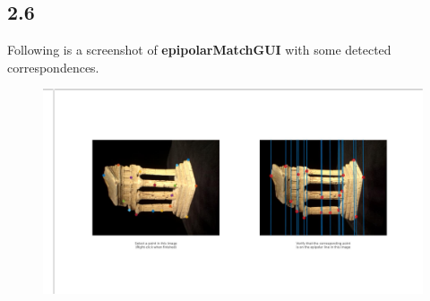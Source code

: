 \documentclass{article}
\begin{document}
\subsection*{2.6}
Following is a screenshot of \textbf{epipolarMatchGUI} with some detected correspondences.
\begin{figure}[H]
    \centering
    \includegraphics[width=6.5in]{./figures/q2_6}
\end{figure}
\end{document}

